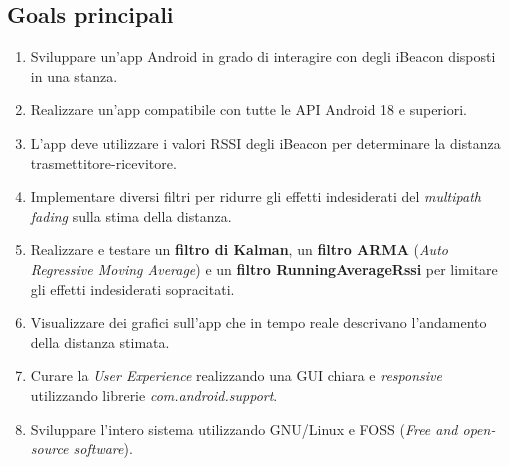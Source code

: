 \subsection{Goals principali}
\begin{enumerate}
	\item Sviluppare un'app Android in grado di interagire con degli iBeacon disposti in una stanza.
	
	\item Realizzare un'app compatibile con tutte le API Android 18 e superiori.
	
	\item L'app deve utilizzare i valori RSSI degli iBeacon per determinare la distanza trasmettitore-ricevitore.
	
	\item Implementare diversi filtri per ridurre gli effetti indesiderati del \textit{multipath fading} sulla stima della distanza.
	
	\item Realizzare e testare un \textbf{filtro di Kalman}, un \textbf{filtro ARMA} (\textit{Auto Regressive Moving Average}) e un \textbf{filtro RunningAverageRssi} per limitare gli effetti indesiderati sopracitati.
	
	\item Visualizzare dei grafici sull'app che in tempo reale descrivano l'andamento della distanza stimata.
	
	\item Curare la \textit{User Experience} realizzando una GUI chiara e \textit{responsive} utilizzando librerie \textit{com.android.support}.
	
	\item Sviluppare l'intero sistema utilizzando GNU/Linux e FOSS (\textit{Free and open-source software}).
\end{enumerate}

